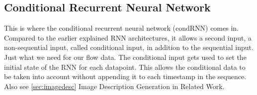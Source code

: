 \documentclass[
	ngerman,
	ruledheaders=section,%
	class=report,%
	thesis={type=bachelor},%
	accentcolor=9c,%
	custommargins=true,%
	marginpar=false,%
	parskip=half-,%
	fontsize=11pt,%
]{tudapub}
\begin{document}



\subsection{Conditional Recurrent Neural Network}
\label{sec:condRNN}

This is where the conditional recurrent neural network (condRNN) \cite{remyPhilipperemyCondRnn2020} comes in.
Compared to the earlier explained RNN architectures, it allows a second input, a non-sequential input, called conditional input, in addition to the sequential input.
Just what we need for our flow data.
The conditional input gets used to set the initial state of the RNN for each datapoint.
This allows the conditional data to be taken into account without appending it to each timestamp in the sequence.
Also see \ref{sec:imagedesc} Image Description Generation in Related Work.
\end{document}
